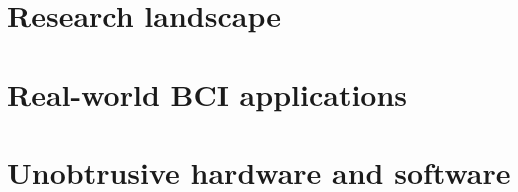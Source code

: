







\section{Research landscape}
\label{chapter2-research-landscape}


\section{Real-world BCI applications}
\label{chapter2-real-world-bci-applications}






\section{Unobtrusive hardware and software}
\label{chapter2-unobtrusive-hardware-and-software}

